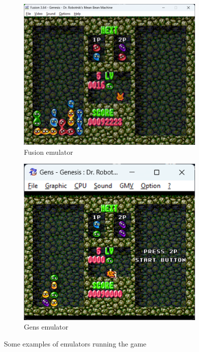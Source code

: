 \documentclass{article}
\begin{document}
\begin{figure}[h]
\centering
\begin{subfigure}{0.49\textwidth}
\centering
\includegraphics[width = \textwidth]{emulator1.png}
\caption{Fusion emulator}
\label{fig:emu1}
\end{subfigure}
\begin{subfigure}{0.45\textwidth}
\centering
\includegraphics[width = \textwidth]{emulator2.png}
\caption{Gens emulator}
\label{fig:emu2}
\end{subfigure}
\caption{Some examples of emulators running the game}
\label{fig:combined}
\end{figure}
\end{document}

